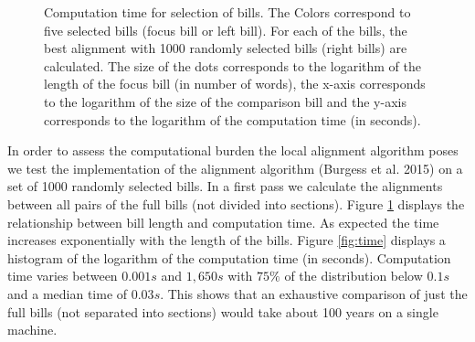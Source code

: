 \documentclass[12pt]{article} %
\begin{document}
\begin{figure}[ht!]
\caption{Computation time for selection of bills. The Colors correspond to five selected bills (focus bill or left bill). For each of the bills, the best alignment with 1000 randomly selected bills (right bills) are calculated. The size of the dots corresponds to the logarithm of the length of the focus bill (in number of words), the x-axis corresponds to the logarithm of the size of the comparison bill and the y-axis corresponds to the logarithm of the computation time (in seconds).}
\label{fig:time_size}
\end{figure}

In order to assess the computational burden the local alignment algorithm poses we test the implementation of the alignment algorithm (Burgess et al. 2015) on a set of 1000 randomly selected bills. In a first pass we calculate the alignments  between all pairs of the full bills (not divided into sections). Figure \ref{fig:time_size} displays the relationship between bill length and computation time. As expected the time increases exponentially with the length of the bills. Figure \ref{fig:time} displays a histogram of the logarithm of the computation time (in seconds). Computation time varies between $0.001s$ and $1,650s$ with $75\%$ of the distribution below $0.1s$ and a median time of $0.03s$.  This shows that an exhaustive comparison of just the full bills (not separated into sections) would take about 100 years on a single machine.
\end{document}
